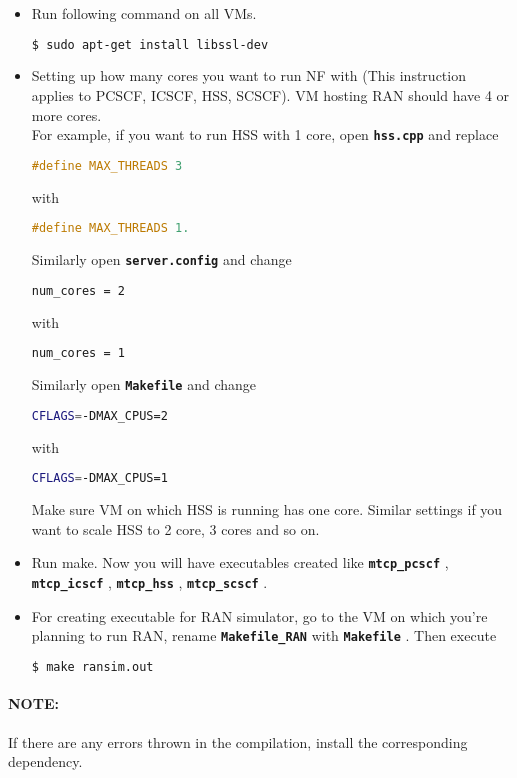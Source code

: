 \documentclass[hidelinks]{report}
\newcommand{\cf}[1] {
	\textbf{\texttt{#1}}
}
\begin{document}
\begin{itemize}
\item Run following command on all VMs.
\begin{lstlisting}[language=bash]
$ sudo apt-get install libssl-dev 
\end{lstlisting}
\item  Setting up how many cores you want to run NF with (This instruction applies to PCSCF, ICSCF, HSS, SCSCF). VM hosting RAN should have 4 or more cores.\\
For example, if you want to run HSS with 1 core, open \cf{hss.cpp} and replace 
\begin{lstlisting}[language=c]
#define MAX_THREADS 3 \end{lstlisting}
with
\begin{lstlisting}[language=c]
#define MAX_THREADS 1.\end{lstlisting}
Similarly open\cf{server.config} and change 
\begin{lstlisting}[language=bash]
num_cores = 2
\end{lstlisting}
with
\begin{lstlisting}[language=bash]
num_cores = 1
\end{lstlisting}

Similarly open \cf{Makefile} and change
\begin{lstlisting}[language=bash]
CFLAGS=-DMAX_CPUS=2
\end{lstlisting}

with 
\begin{lstlisting}[language=bash]
CFLAGS=-DMAX_CPUS=1
\end{lstlisting}



Make sure VM on which HSS is running has one core. Similar settings if you want to scale HSS to 2 core, 3 cores and so on. 
\item  Run make. Now you will have executables created like \cf{mtcp\_pcscf}, \cf{mtcp\_icscf}, \cf{mtcp\_hss},  \cf{mtcp\_scscf}.

\item For creating executable for RAN simulator, go to the VM on which you're planning to run RAN, rename \cf{Makefile\_RAN} with \cf{Makefile}. Then execute
\begin{lstlisting}[language=bash]
$ make ransim.out
\end{lstlisting}
\end{itemize}
\paragraph*{NOTE:} If there are any errors thrown in the compilation, install the corresponding dependency.  
\end{document}
